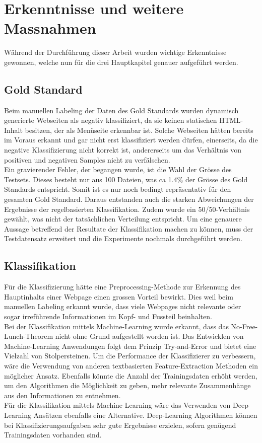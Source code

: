 \chapter{Erkenntnisse und weitere Massnahmen}
\label{chap:fazit}
Während der Durchführung dieser Arbeit wurden wichtige Erkenntnisse gewonnen, welche nun für die drei Hauptkapitel genauer aufgeführt werden.
\section{Gold Standard}
Beim manuellen Labeling der Daten des Gold Standards wurden dynamisch generierte Webseiten als negativ klassifiziert, da sie keinen statischen HTML-Inhalt besitzen, der als Menüseite erkennbar ist.
Solche Webseiten hätten bereits im Voraus erkannt und gar nicht erst klassifiziert werden dürfen, einerseits, da die negative Klassifizierung nicht korrekt ist, andererseits um das Verhältnis von positiven und negativen Samples nicht zu verfälschen.\\
Ein gravierender Fehler, der begangen wurde, ist die Wahl der Grösse des Testsets.
Dieses besteht nur aus 100 Dateien, was ca 1.4\% der Grösse des Gold Standards entspricht.
Somit ist es nur noch bedingt repräsentativ für den gesamten Gold Standard.
Daraus entstanden auch die starken Abweichungen der Ergebnisse der regelbasierten Klassifikation.
Zudem wurde ein 50/50-Verhältnis gewählt, was nicht der tatsächlichen Verteilung entspricht.
Um eine genauere Aussage betreffend der Resultate der Klassifikation machen zu können, muss der Testdatensatz erweitert und die Experimente nochmals durchgeführt werden.
\section{Klassifikation}
Für die Klassifizierung hätte eine Preprocessing-Methode zur Erkennung des Hauptinhalts einer Webpage einen grossen Vorteil bewirkt.
Dies weil beim manuellen Labeling erkannt wurde, dass viele Webpages nicht relevante oder sogar irreführende Informationen im Kopf- und Fussteil beinhalten.\\
Bei der Klassifikation mittels Machine-Learning wurde erkannt, dass das \glqq No-Free-Lunch\grqq{}-Theorem nicht ohne Grund aufgestellt worden ist.
Das Entwicklen von Machine-Learning Anwendungen folgt dem Prinzip \glqq Try-and-Error\grqq{} und bietet eine Vielzahl von Stolpersteinen.
Um die Performance der Klassifizierer zu verbessern, wäre die Verwendung von anderen textbasierten Feature-Extraction Methoden ein möglicher Ansatz.
Ebenfalls könnte die Anzahl der Trainingsdaten erhöht werden, um den Algorithmen die Möglichkeit zu geben, mehr relevante Zusammenhänge aus den Informationen zu entnehmen.\\
Für die Klassifikation mittels Machine-Learning wäre das Verwenden von Deep-Learning Ansätzen ebenfalls eine Alternative.
Deep-Learning Algorithmen können bei Klassifizierungsaufgaben sehr gute Ergebnisse erzielen, sofern genügend Trainingsdaten vorhanden sind.\\

